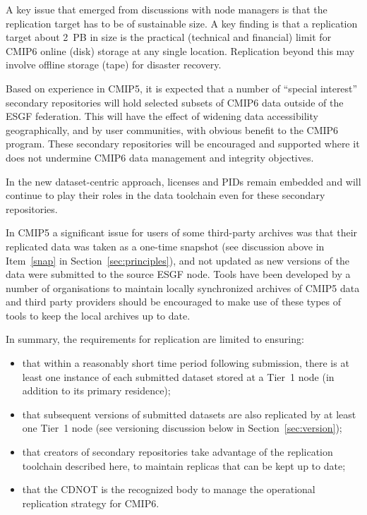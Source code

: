 \documentclass[gmd,manuscript]{copernicus}
\begin{document}
A key issue that emerged from discussions with node managers is that
the replication target has to be of sustainable size. A key finding is
that a replication target about 2~PB in size is the practical
(technical and financial) limit for CMIP6 online (disk) storage at any
single location. Replication beyond this may involve offline storage
(tape) for disaster recovery.

Based on experience in CMIP5, it is expected that a number of
``special interest'' secondary repositories will hold selected subsets
of CMIP6 data outside of the ESGF federation. This will have the
effect of widening data accessibility geographically, and by user
communities, with obvious benefit to the CMIP6 program. These
secondary repositories will be encouraged and supported where it does
not undermine CMIP6 data management and integrity objectives.

In the new dataset-centric approach, licenses and PIDs remain embedded
and will continue to play their roles in the data toolchain even for
these secondary repositories.

In CMIP5 a significant issue for users of some third-party archives
was that their replicated data was taken as a one-time snapshot (see
discussion above in Item~\ref{snap} in Section~\ref{sec:principles}),
and not updated as new versions of the data were submitted to the
source ESGF node. Tools have been developed by a number of
organisations to maintain locally synchronized archives of CMIP5 data
and third party providers should be encouraged to make use of these
types of tools to keep the local archives up to date.

In summary, the requirements for replication are limited to ensuring:

\begin{itemize}
\item that within a reasonably short time period following submission,
there is at least one instance of each submitted dataset
  stored at a Tier~1 node (in addition to its primary residence);
\item that subsequent versions of submitted datasets are also
  replicated by at least one Tier~1 node (see versioning discussion
  below in Section~\ref{sec:version});
\item that creators of secondary repositories take advantage of the
  replication toolchain described here, to maintain replicas that can
  be kept up to date;
\item that the CDNOT is the recognized body to manage the operational
  replication strategy for CMIP6.
\end{itemize}
\end{document}
